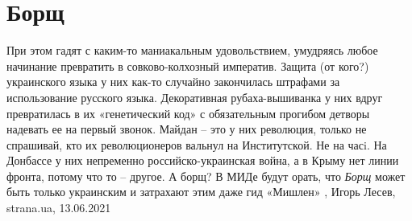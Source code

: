  
 
 
 
 
\chapter{Борщ}

При этом гадят с каким-то маниакальным удовольствием, умудряясь любое начинание
превратить в совково-колхозный императив. Защита (от кого?) украинского языка у
них как-то случайно закончилась штрафами за использование русского языка.
Декоративная рубаха-вышиванка у них вдруг превратилась в их «генетический код»
с обязательным прогибом детворы надевать ее на первый звонок. Майдан – это у
них революция, только не спрашивай, кто их революционеров вальнул на
Институтской. Не на часi. На Донбассе у них непременно российско-украинская
война, а в Крыму нет линии фронта, потому что то – другое. А борщ? В МИДе будут
орать, что \emph{Борщ} может быть только украинским и затрахают этим даже гид
«Мишлен»
, 
Игорь Лесев, strana.ua, 13.06.2021

